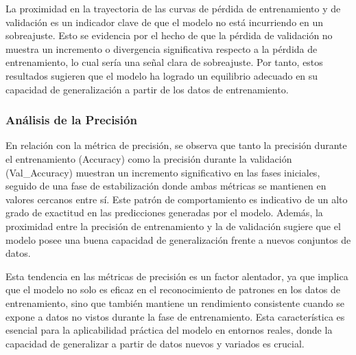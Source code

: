 La proximidad en la trayectoria de las curvas de pérdida de entrenamiento y de validación es un indicador clave de que el modelo no está incurriendo en un sobreajuste. Esto se evidencia por el hecho de que la pérdida de validación no muestra un incremento o divergencia significativa respecto a la pérdida de entrenamiento, lo cual sería una señal clara de sobreajuste. Por tanto, estos resultados sugieren que el modelo ha logrado un equilibrio adecuado en su capacidad de generalización a partir de los datos de entrenamiento.

\subsubsection{\textbf{Análisis de la Precisión}} 

En relación con la métrica de precisión, se observa que tanto la precisión durante el entrenamiento (Accuracy) como la precisión durante la validación (Val\_Accuracy) muestran un incremento significativo en las fases iniciales, seguido de una fase de estabilización donde ambas métricas se mantienen en valores cercanos entre sí. Este patrón de comportamiento es indicativo de un alto grado de exactitud en las predicciones generadas por el modelo. Además, la proximidad entre la precisión de entrenamiento y la de validación sugiere que el modelo posee una buena capacidad de generalización frente a nuevos conjuntos de datos.

Esta tendencia en las métricas de precisión es un factor alentador, ya que implica que el modelo no solo es eficaz en el reconocimiento de patrones en los datos de entrenamiento, sino que también mantiene un rendimiento consistente cuando se expone a datos no vistos durante la fase de entrenamiento. Esta característica es esencial para la aplicabilidad práctica del modelo en entornos reales, donde la capacidad de generalizar a partir de datos nuevos y variados es crucial.

